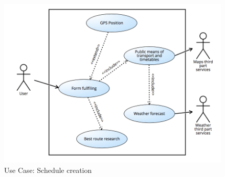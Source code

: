 \documentclass[numbers=noenddot, 12pt, a4paper, oneside]{scrbook}
\begin{document}
\begin{figure}[H]
	\includegraphics[width=1\textwidth]{usecases/Scenario2}
	\caption{Use Case: Schedule creation}
\end{figure}
\end{document}
